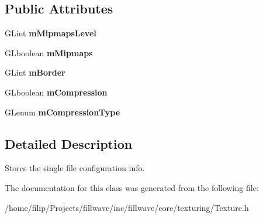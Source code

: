 \subsection*{Public Attributes}
\begin{DoxyCompactItemize}
\item 
\hypertarget{classfillwave_1_1core_1_1Texture2DFileConfig_a18a1a818bdefd293b6861893fedb56fc}{}G\+Lint {\bfseries m\+Mipmaps\+Level}\label{classfillwave_1_1core_1_1Texture2DFileConfig_a18a1a818bdefd293b6861893fedb56fc}

\item 
\hypertarget{classfillwave_1_1core_1_1Texture2DFileConfig_af2412d3609748ec726594c40d4122e69}{}G\+Lboolean {\bfseries m\+Mipmaps}\label{classfillwave_1_1core_1_1Texture2DFileConfig_af2412d3609748ec726594c40d4122e69}

\item 
\hypertarget{classfillwave_1_1core_1_1Texture2DFileConfig_a33b1d55d9fb4048b4628c9bf3539d133}{}G\+Lint {\bfseries m\+Border}\label{classfillwave_1_1core_1_1Texture2DFileConfig_a33b1d55d9fb4048b4628c9bf3539d133}

\item 
\hypertarget{classfillwave_1_1core_1_1Texture2DFileConfig_ae4bd01d5bd336805712b61426e2bc924}{}G\+Lboolean {\bfseries m\+Compression}\label{classfillwave_1_1core_1_1Texture2DFileConfig_ae4bd01d5bd336805712b61426e2bc924}

\item 
\hypertarget{classfillwave_1_1core_1_1Texture2DFileConfig_a9e2adac0df9ad448cb20bfa2b72796cc}{}G\+Lenum {\bfseries m\+Compression\+Type}\label{classfillwave_1_1core_1_1Texture2DFileConfig_a9e2adac0df9ad448cb20bfa2b72796cc}

\end{DoxyCompactItemize}


\subsection{Detailed Description}
Stores the single file configuration info. 

The documentation for this class was generated from the following file\+:\begin{DoxyCompactItemize}
\item 
/home/filip/\+Projects/fillwave/inc/fillwave/core/texturing/Texture.\+h\end{DoxyCompactItemize}
